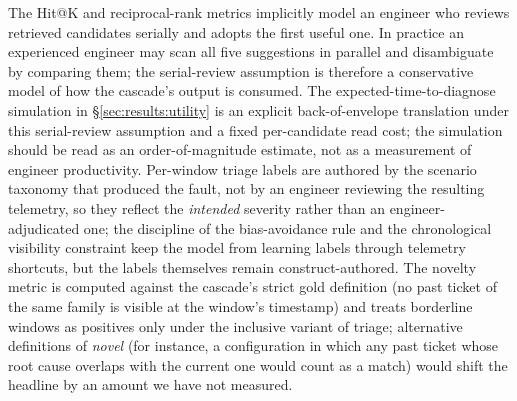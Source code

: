 The Hit@K and reciprocal-rank metrics implicitly model an engineer who reviews retrieved candidates serially and adopts the first useful one. In practice an experienced engineer may scan all five suggestions in parallel and disambiguate by comparing them; the serial-review assumption is therefore a conservative model of how the cascade's output is consumed. The expected-time-to-diagnose simulation in \S\ref{sec:results:utility} is an explicit back-of-envelope translation under this serial-review assumption and a fixed per-candidate read cost; the simulation should be read as an order-of-magnitude estimate, not as a measurement of engineer productivity. Per-window triage labels are authored by the scenario taxonomy that produced the fault, not by an engineer reviewing the resulting telemetry, so they reflect the \emph{intended} severity rather than an engineer-adjudicated one; the discipline of the bias-avoidance rule and the chronological visibility constraint keep the model from learning labels through telemetry shortcuts, but the labels themselves remain construct-authored. The novelty metric is computed against the cascade's strict gold definition (no past ticket of the same family is visible at the window's timestamp) and treats borderline windows as positives only under the inclusive variant of triage; alternative definitions of \emph{novel} (for instance, a configuration in which any past ticket whose root cause overlaps with the current one would count as a match) would shift the headline by an amount we have not measured.
